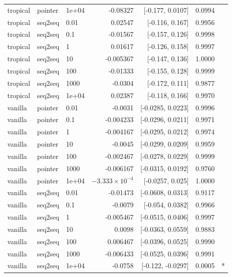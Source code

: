 \documentclass[10pt]{article}
\begin{document}
{\begin{longtable}{lllrrrl}
tropical & pointer & 1e+04 & -0.08327 & [-0.177, 0.0107] & 0.0994 & \\
tropical & seq2seq & 0.01 & 0.02547 & [-0.116, 0.167] & 0.9956 & \\
tropical & seq2seq & 0.1 & -0.01567 & [-0.157, 0.126] & 0.9998 & \\
tropical & seq2seq & 1 & 0.01617 & [-0.126, 0.158] & 0.9997 & \\
tropical & seq2seq & 10 & -0.005367 & [-0.147, 0.136] & 1.0000 & \\
tropical & seq2seq & 100 & -0.01333 & [-0.155, 0.128] & 0.9999 & \\
tropical & seq2seq & 1000 & -0.0304 & [-0.172, 0.111] & 0.9877 & \\
tropical & seq2seq & 1e+04 & 0.02387 & [-0.118, 0.166] & 0.9970 & \\
vanilla & pointer & 0.01 & -0.0031 & [-0.0285, 0.0223] & 0.9996 & \\
vanilla & pointer & 0.1 & -0.004233 & [-0.0296, 0.0211] & 0.9971 & \\
vanilla & pointer & 1 & -0.004167 & [-0.0295, 0.0212] & 0.9974 & \\
vanilla & pointer & 10 & -0.0045 & [-0.0299, 0.0209] & 0.9959 & \\
vanilla & pointer & 100 & -0.002467 & [-0.0278, 0.0229] & 0.9999 & \\
vanilla & pointer & 1000 & -0.006167 & [-0.0315, 0.0192] & 0.9760 & \\
vanilla & pointer & 1e+04 & $-3.333\times10^{-4}$ & [-0.0257, 0.025] & 1.0000 & \\
vanilla & seq2seq & 0.01 & -0.01473 & [-0.0608, 0.0313] & 0.9117 & \\
vanilla & seq2seq & 0.1 & -0.0079 & [-0.054, 0.0382] & 0.9966 & \\
vanilla & seq2seq & 1 & -0.005467 & [-0.0515, 0.0406] & 0.9997 & \\
vanilla & seq2seq & 10 & 0.0098 & [-0.0363, 0.0559] & 0.9883 & \\
vanilla & seq2seq & 100 & 0.006467 & [-0.0396, 0.0525] & 0.9990 & \\
vanilla & seq2seq & 1000 & -0.006433 & [-0.0525, 0.0396] & 0.9991 & \\
vanilla & seq2seq & 1e+04 & -0.0758 & [-0.122, -0.0297] & 0.0005 & *\\
\bottomrule
\end{longtable}
}
\end{document}
